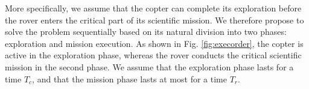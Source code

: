 \documentclass[conference]{IEEEtran}
\begin{document}
More specifically, we assume that the copter can complete its exploration before the rover enters the critical part of its scientific mission. We therefore propose to solve the problem sequentially based on its natural division into two phases: exploration and mission execution. As shown in Fig. \ref{fig:execorder}, the copter is active in the exploration phase, whereas the rover conducts the critical scientific mission in the second phase. We assume that the exploration phase lasts for a time $T_c$, and that the mission phase lasts at most for a time $T_r$. 
%
%
%
%
%
%
%
%
%
\end{document}
